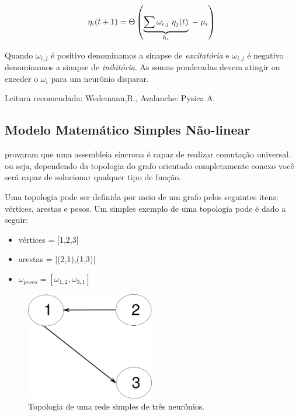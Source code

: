\begin{eqnarray}
\centering
\eta_{i}(t+1)= \Theta\left( \underbrace{\sum \omega_{i,j}\; \eta_{j}(t)}_{h_{i}}\;-\;\mu_{i}\right)
\label{movimento}
\end{eqnarray}

Quando $\omega_{i,j}$ é positivo denominamos a sinapse de \textit{excitatória} e $\omega_{i,j}$ é negativo denominamos a sinapse de \textit{inibitória}. As somas ponderadas devem atingir ou exceder o $\omega_{i}$ para um neurônio disparar.

Leitura recomendada: Wedemann,R., Avalanche: Pysica A. 

\subsection{Modelo Matemático Simples Não-linear}

\citet{McCulloch1943} provaram que uma assembleia síncrona é capaz de realizar comutação universal. ou seja, dependendo da topologia do grafo orientado completamente conexo você será capaz de solucionar qualquer tipo de função. 

Uma topologia pode ser definida por meio de um grafo pelos seguintes itens: vértices, arestas e pesos. Um simples exemplo de uma topologia pode é dado a seguir:

\begin{itemize}
	\item vértices = [1,2,3]
	\item arestas = [(2,1),(1,3)]
	\item $\omega_{pesos} = [\omega_{1,2},\omega_{3,1}]$
\end{itemize}

\begin{figure}[H]
	\centering
	\includegraphics[width=0.5\textwidth]{Imagens/Fig11.png}
	\caption{Topologia de uma rede simples de três neurônios.}
	\label{Topologia}
\end{figure}

